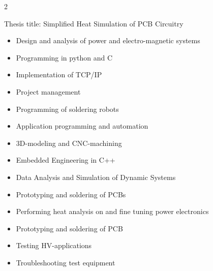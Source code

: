 \documentclass[10pt,a4paper,ragged2e,withhyper]{altacv}
\begin{document}
\begin{paracol}{2}

Thesis title: Simplified Heat Simulation of PCB Circuitry 

\begin{itemize}
\item Design and analysis of power and electro-magnetic systems
\item Programming in python and C
\item Implementation of TCP/IP
\item Project management
\end{itemize}


\begin{itemize}
\item Programming of soldering robots
\item Application programming and automation
\item 3D-modeling and CNC-machining 
\end{itemize}

\divider

\begin{itemize}
\item Embedded Engineering in C++ 
\item Data Analysis and Simulation of Dynamic Systems
\item Prototyping and soldering of PCBs 
\end{itemize}

\divider

\begin{itemize}
\item Performing heat analysis on and fine tuning power electronics
\item Prototyping and soldering of PCB
\end{itemize}

\divider

\begin{itemize}
\item Testing HV-applications
\item Troubleshooting test equipment
\end{itemize}


\end{paracol}
\end{document}
